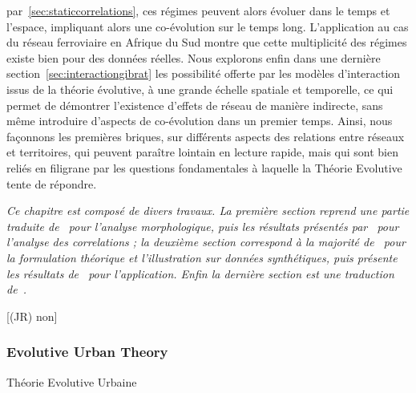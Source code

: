 par~\ref{sec:staticcorrelations}, ces régimes peuvent alors évoluer dans le temps et l'espace, impliquant alors une co-évolution sur le temps long. L'application au cas du réseau ferroviaire en Afrique du Sud montre que cette multiplicité des régimes existe bien pour des données réelles. Nous explorons enfin dans une dernière section~\ref{sec:interactiongibrat} les possibilité offerte par les modèles d'interaction issus de la théorie évolutive, à une grande échelle spatiale et temporelle, ce qui permet de démontrer l'existence d'effets de réseau de manière indirecte, sans même introduire d'aspects de co-évolution dans un premier temps. Ainsi, nous façonnons les premières briques, sur différents aspects des relations entre réseaux et territoires, qui peuvent paraître lointain en lecture rapide, mais qui sont bien reliés en filigrane par les questions fondamentales à laquelle la Théorie Evolutive tente de répondre.




\stars


\textit{Ce chapitre est composé de divers travaux. La première section reprend une partie traduite de~\cite{} pour l'analyse morphologique, puis les résultats présentés par~\cite{raimbault2016cautious} pour l'analyse des correlations ; la deuxième section correspond à la majorité de~\cite{} pour la formulation théorique et l'illustration sur données synthétiques, puis présente les résultats de~\cite{} pour l'application. Enfin la dernière section est une traduction de~\cite{}.}

[(JR) non]







\newpage


\subsubsection*{Evolutive Urban Theory}{Théorie Evolutive Urbaine}



